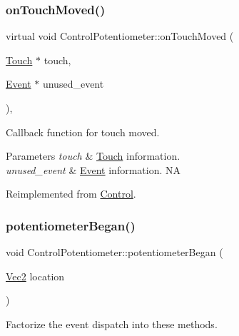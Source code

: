 \subsubsection{\texorpdfstring{on\+Touch\+Moved()}{onTouchMoved()}\hspace{0.1cm}{\footnotesize\ttfamily [2/2]}}
{\footnotesize\ttfamily virtual void Control\+Potentiometer\+::on\+Touch\+Moved (\begin{DoxyParamCaption}\item[{\hyperlink{classTouch}{Touch} $\ast$}]{touch,  }\item[{\hyperlink{classEvent}{Event} $\ast$}]{unused\+\_\+event }\end{DoxyParamCaption})\hspace{0.3cm}{\ttfamily [override]}, {\ttfamily [virtual]}}

Callback function for touch moved.


\begin{DoxyParams}{Parameters}
{\em touch} & \hyperlink{classTouch}{Touch} information. \\
\hline
{\em unused\+\_\+event} & \hyperlink{classEvent}{Event} information.  NA \\
\hline
\end{DoxyParams}


Reimplemented from \hyperlink{classControl_a26d2e6af053319dc605949678f726622}{Control}.

\mbox{\label{classControlPotentiometer_a69e8c5d377472fd170890ae3690bb4de}} 
\subsubsection{\texorpdfstring{potentiometer\+Began()}{potentiometerBegan()}\hspace{0.1cm}{\footnotesize\ttfamily [1/2]}}
{\footnotesize\ttfamily void Control\+Potentiometer\+::potentiometer\+Began (\begin{DoxyParamCaption}\item[{\hyperlink{classVec2}{Vec2}}]{location }\end{DoxyParamCaption})}

Factorize the event dispatch into these methods. \mbox{\label{classControlPotentiometer_a69e8c5d377472fd170890ae3690bb4de}} 
